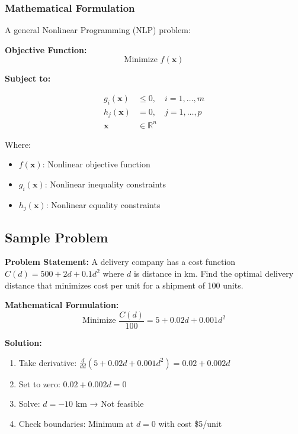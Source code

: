 \documentclass[
  letterpaper,
  DIV=11,
  numbers=noendperiod]{scrreprt}
\providecommand{\tightlist}{%
  \setlength{\itemsep}{0pt}\setlength{\parskip}{0pt}}
\begin{document}
\subsubsection{Mathematical
Formulation}\label{mathematical-formulation-1}

A general Nonlinear Programming (NLP) problem:

\textbf{Objective Function:} \[
\text{Minimize } f(\mathbf{x})
\]

\textbf{Subject to:}

\[
\begin{aligned}
g_i(\mathbf{x}) & \leq 0, \quad i = 1, \ldots, m \\
h_j(\mathbf{x}) & = 0, \quad j = 1, \ldots, p \\
\mathbf{x} & \in \mathbb{R}^n
\end{aligned}
\]

Where:

\begin{itemize}
\tightlist
\item
  \(f(\mathbf{x})\): Nonlinear objective function
\item
  \(g_i(\mathbf{x})\): Nonlinear inequality constraints\\
\item
  \(h_j(\mathbf{x})\): Nonlinear equality constraints
\end{itemize}

\subsection{Sample Problem}\label{sample-problem}

\textbf{Problem Statement:} A delivery company has a cost function
\(C(d) = 500 + 2d + 0.1d^2\) where \(d\) is distance in km. Find the
optimal delivery distance that minimizes cost per unit for a shipment of
100 units.

\textbf{Mathematical Formulation:} \[
\text{Minimize } \frac{C(d)}{100} = 5 + 0.02d + 0.001d^2
\]

\textbf{Solution:}

\begin{enumerate}
\def\labelenumi{\arabic{enumi}.}
\tightlist
\item
  Take derivative:
  \(\frac{d}{dd}\left(5 + 0.02d + 0.001d^2\right) = 0.02 + 0.002d\)
\item
  Set to zero: \(0.02 + 0.002d = 0\)
\item
  Solve: \(d = -10\) km → Not feasible
\item
  Check boundaries: Minimum at \(d = 0\) with cost \$5/unit
\end{enumerate}
\end{document}
